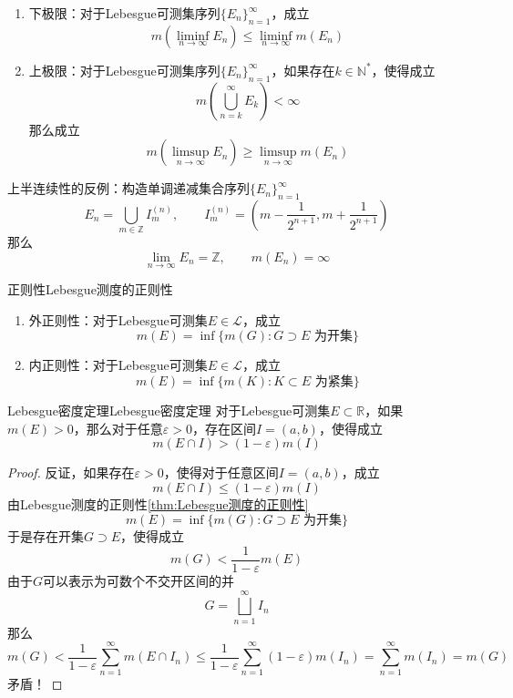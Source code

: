 \documentclass[lang = cn, scheme = chinese, thmcnt = section]{elegantbook}
\newcommand{\N}{\mathbb{N}}            %
\newcommand{\R}{\mathbb{R}}            %
\newcommand{\Z}{\mathbb{Z}}            %
\newcommand{\sub}{\subset}             %
\begin{document}
\begin{corollary}
	\begin{enumerate}
		\item 下极限：对于Lebesgue可测集序列$\{ E_n \}_{n=1}^{\infty}$，成立%
		$$
		m\left(\liminf_{n\to\infty}{E_n}\right)\le\liminf_{n\to\infty}{m(E_n)}
		$$
		\item 上极限：对于Lebesgue可测集序列$\{ E_n \}_{n=1}^{\infty}$，如果存在$k\in\N^*$，使得成立%
		$$
		m\left( \bigcup_{n=k}^{\infty}{E_k} \right)<\infty
		$$
		那么成立%
		$$
		m\left(\limsup_{n\to\infty}{E_n}\right)\ge\limsup_{n\to\infty}{m(E_n)}
		$$
	\end{enumerate}
\end{corollary}

\begin{note}
	上半连续性的反例：构造单调递减集合序列$\{ E_n \}_{n=1}^{\infty}$
	$$
	E_n=\bigcup_{m\in\Z}{I_m^{(n)}},\qquad 
	I_m^{(n)}=\left(m-\frac{1}{2^{n+1}},m+\frac{1}{2^{n+1}}\right)
	$$
	那么
	$$
	\lim_{n\to\infty}E_n=\Z,\qquad
	m(E_n)=\infty
	$$
\end{note}

\begin{theorem}{正则性}{Lebesgue测度的正则性}
	\begin{enumerate}
		\item 外正则性：对于Lebesgue可测集$E\in \mathscr{L}$，成立
		$$
		m(E)=\inf\{ m(G):G\supset E\text{ 为开集} \}
		$$
		\item 内正则性：对于Lebesgue可测集$E\in \mathscr{L}$，成立
		$$
		m(E)=\inf\{ m(K):K\sub E\text{ 为紧集} \}
		$$
	\end{enumerate}
\end{theorem}

\begin{theorem}{Lebesgue密度定理}{Lebesgue密度定理}
	对于Lebesgue可测集$E\sub\R$，如果$m(E)>0$，那么对于任意$\varepsilon>0$，存在区间$I=(a,b)$，使得成立%
	$$
	m(E\cap I)>(1-\varepsilon)m(I)
	$$
\end{theorem}

\begin{proof}
	反证，如果存在$\varepsilon>0$，使得对于任意区间$I=(a,b)$，成立
	$$
	m(E\cap I)\le(1-\varepsilon)m(I)
	$$
	由Lebesgue测度的正则性\ref{thm:Lebesgue测度的正则性}
	$$
	m(E)=\inf\{ m(G):G\supset E\text{ 为开集} \}
	$$
	于是存在开集$G\supset E$，使得成立%
	$$
	m(G)<\frac{1}{1-\varepsilon}m(E)
	$$
	由于$G$可以表示为可数个不交开区间的并%
	$$
	G=\bigsqcup_{n=1}^{\infty}I_n
	$$
	那么%
	$$
	m(G)
	<\frac{1}{1-\varepsilon}\sum_{n=1}^{\infty}m(E\cap I_n)
	\le\frac{1}{1-\varepsilon}\sum_{n=1}^{\infty}(1-\varepsilon)m(I_n)
	=\sum_{n=1}^{\infty}m(I_n)
	=m(G)
	$$
	矛盾！
\end{proof}
\end{document}
